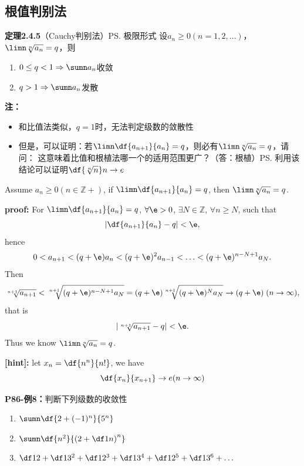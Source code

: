 \subsection{根值判别法}

{\bf 定理2.4.5}（Cauchy判别法）\ps{极限形式}
设$a_n\geq 0(n=1,2,\ldots)$，$\limn\sqrt[n]{a_n}=q$，则
\begin{enumerate}
  \setlength{\itemindent}{1cm}
  \item $0\leq q<1\Rightarrow\sumn a_n$收敛
  \item $q>1\Rightarrow\sumn a_n$发散
\end{enumerate}

{\bf 注：}
\begin{itemize}
  \setlength{\itemindent}{1cm}
  \item 和比值法类似，$q=1$时，无法判定级数的敛散性
  \item
  但是，可以证明：若$\limn\df{a_{n+1}}{a_n}=q$，则必有$\limn\sqrt[n]{a_n}=q$，请问：
  这意味着比值和根植法哪一个的适用范围更广？（答：根植）\ps{利用该结论可以证明$\df{\sqrt[n]n}n\to e$}
\end{itemize}


\begin{shaded}
Assume $a_n\geq 0(n\in\mathbb{Z}+)$, if $\limn\df{a_{n+1}}{a_n}=q$, then
$\limn\sqrt[n]{a_n}=q$.

{\bf proof:} For $\limn\df{a_{n+1}}{a_n}=q$, $\forall \e>0$, $\exists
N\in\mathbb{Z}$, $\forall n\geq N$, such that
$$\left|\df{a_{n+1}}{a_n}-q\right|<\e,$$
hence
$$0<a_{n+1}<(q+\e)a_n<(q+\e)^2a_{n-1}<\ldots<(q+\e)^{n-N+1}a_N.$$
Then
$$\sqrt[n+1]{a_{n+1}}<\sqrt[n+1]{(q+\e)^{n-N+1}a_N}=(q+\e)
\sqrt[n+1]{(q+\e)^Na_N}\to(q+\e)\;(n\to\infty),$$
that is
$$|\sqrt[n+1]{a_{n+1}}-q|<\e.$$
Thus we know $\limn\sqrt[n]{a_n}=q$.
\end{shaded}


{\bf [hint]:} let $x_n=\df{n^n}{n!}$, we have
$$\df{x_{n}}{x_{n+1}}\to e(n\to\infty)$$

{\bf P86-例8：}判断下列级数的收敛性
\begin{enumerate} [(1)]
  \setlength{\itemindent}{1cm}
  \item $\sumn\df{2+(-1)^n}{5^n}$
  \item $\sumn\df{n^2}{\left(2+\df 1n\right)^n}$
  \item $\df 12+\df 1{3^2}+\df 1{2^3}+\df 1{3^4}+\df 1{2^5}+\df 1{3^6}+\ldots$
\end{enumerate}


